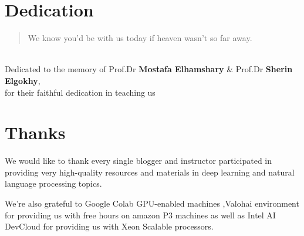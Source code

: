 \chapter*{Dedication}
\thispagestyle{empty}

\vspace*{\fill} 
\begin{quote}
\centering 
We know you’d be with us today if heaven wasn’t so far away.~\\
\end{quote}


\begin{center}
~\\
Dedicated to the memory of Prof.Dr  \textbf{Mostafa Elhamshary} \& Prof.Dr \textbf{Sherin Elgokhy}, ~\\for their faithful dedication in teaching us
\end{center}
\vspace*{\fill}



%
%
%
%

%
%
%
%
%
%
\cleardoublepage%
\chapter*{Thanks}
\thispagestyle{empty}
%
We would like to thank every single blogger and instructor participated in providing very high-quality resources and materials in deep learning and natural language processing topics.

We're also grateful to Google Colab GPU-enabled machines ,Valohai environment for providing us with free hours on amazon P3 machines as well as Intel AI DevCloud for providing us with Xeon Scalable processors.
